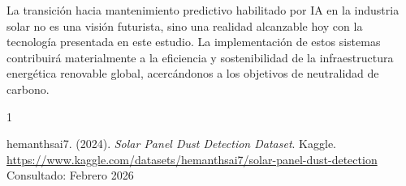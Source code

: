 \documentclass[11pt, a4paper]{article}
\begin{document}
La transición hacia mantenimiento predictivo habilitado por IA en la industria solar no es una visión futurista, sino una realidad alcanzable hoy con la tecnología presentada en este estudio. La implementación de estos sistemas contribuirá materialmente a la eficiencia y sostenibilidad de la infraestructura energética renovable global, acercándonos a los objetivos de neutralidad de carbono.

\begin{thebibliography}{1}

hemanthsai7. (2024). \textit{Solar Panel Dust Detection Dataset}. Kaggle. \\
\url{https://www.kaggle.com/datasets/hemanthsai7/solar-panel-dust-detection} \\
Consultado: Febrero 2026

\end{thebibliography}
\end{document}
